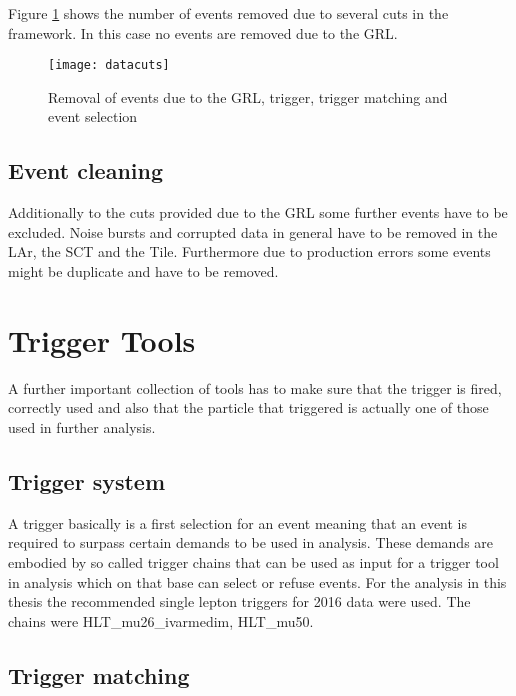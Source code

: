 Figure \ref{fig:datacuts} shows the number of events removed due to several cuts in the framework. In this case no events are removed due to the GRL.


\begin{figure}[h]
\centering
\texttt{[image: datacuts]}
\caption{Removal  of events due to the GRL, trigger, trigger matching and event selection}
\label{fig:datacuts}
\end{figure}



\subsection{Event cleaning}

Additionally to the cuts provided due to the GRL some further events have to be excluded. Noise bursts and corrupted data in general have to be removed in the LAr, the SCT and the Tile. Furthermore due to production errors some events might be duplicate and have to be removed. 



\section{Trigger Tools}

A further important collection of tools has to make sure that the trigger is fired, correctly used and also that the particle that triggered is actually one of those used in further analysis.

\subsection{Trigger system}


A trigger basically is a first selection for an event meaning that an event is required to surpass certain demands to be used in analysis. These demands are embodied by so called trigger chains that can be used as input for a trigger tool in analysis which on that base can select or refuse events. For the analysis in this thesis the recommended single lepton triggers for 2016 data were used. The chains were HLT\_mu26\_ivarmedim, HLT\_mu50.



\subsection{Trigger matching}

